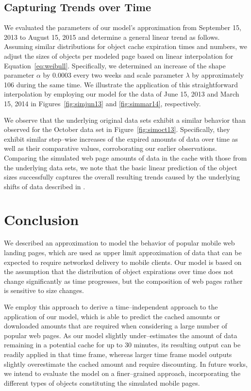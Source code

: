 \documentclass[letterpaper,conference]{IEEEtran}
\begin{document}
\subsection{Capturing Trends over Time}
We evaluated the parameters of our model's approximation from September 15, 2013 to August 15, 2015 and determine a general linear trend as follows. 
Assuming similar distributions for object cache expiration times and numbers, we adjust the sizes of objects per modeled page based on linear interpolation for Equation~\ref{eq:weibull}. 
Specifically, we determined an increase of the shape parameter $\alpha$ by 0.0003 every two weeks and scale parameter $\lambda$ by approximately 106 during the same time. 
We illustrate the application of this straightforward interpolation by employing our model for the data of June 15, 2013 and March 15, 2014 in Figures~\ref{fig:simjun13} and \ref{fig:simmar14}, respectively.

We observe that the underlying original data sets exhibit a similar behavior than observed for the October data set in Figure~\ref{fig:simoct13}.
Specifically, they exhibit similar step--wise increases of the expired amounts of data over time as well as their comparative values, corroborating our earlier observations. 
Comparing the simulated web page amounts of data in the cache with those from the underlying data sets, we note that the basic linear prediction of the object sizes successfully captures the overall resulting trends caused by the underlying shifts of data described in \cite{JoSe14Commag}.




\section{Conclusion}
\label{s:conc}
We described an approximation to model the behavior of popular mobile web landing pages, which are used as upper limit approximation of data that can be expected to require networked delivery to mobile clients.
Our model is based on the assumption that the distribution of object expirations over time does not change significantly as time progresses, but the composition of web pages rather is sensitive to size changes.

We employ this approach to derive a time--independent approach to the application of our model, which is able to predict the cached amounts or downloaded amounts that are required when considering a large number of popular web pages.
As our model slightly under--estimates the amount of data remaining in a potential cache for up to 30 minutes, its resulting output can be readily applied in that time frame, whereas larger time frame model outputs slightly overestimate the cached amount and require discounting.
In future works, we intend to evaluate the model on a finer--grained approach, incorporating the different types of objects constituting the simulated mobile pages.





\end{document}
